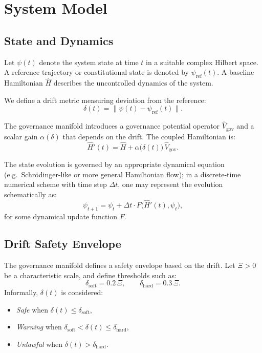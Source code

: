 \documentclass[11pt]{article}
\begin{document}
\section{System Model}

\subsection{State and Dynamics}

Let $\psi(t)$ denote the system state at time $t$ in a suitable complex Hilbert space.
A reference trajectory or constitutional state is denoted by $\psi_{\mathrm{ref}}(t)$.
A baseline Hamiltonian $\hat{H}$ describes the uncontrolled dynamics of the system.

We define a drift metric measuring deviation from the reference:
\begin{equation}
  \delta(t) = \|\psi(t) - \psi_{\mathrm{ref}}(t)\|.
\end{equation}

The governance manifold introduces a governance potential operator $\hat{V}_{\mathrm{gov}}$ and a scalar gain $\alpha(\delta)$ that depends on the drift.
The coupled Hamiltonian is:
\begin{equation}
  \hat{H}'(t) = \hat{H} + \alpha\big(\delta(t)\big)\,\hat{V}_{\mathrm{gov}}.
\end{equation}

The state evolution is governed by an appropriate dynamical equation (e.g.\ Schr\"odinger-like or more general Hamiltonian flow); in a discrete-time numerical scheme with time step $\Delta t$, one may represent the evolution schematically as:
\begin{equation}
  \psi_{t+1} = \psi_t + \Delta t \cdot F\big(\hat{H}'(t), \psi_t\big),
\end{equation}
for some dynamical update function $F$.

\subsection{Drift Safety Envelope}

The governance manifold defines a safety envelope based on the drift.
Let $\Xi > 0$ be a characteristic scale, and define thresholds such as:
\begin{equation}
  \delta_{\mathrm{soft}} = 0.2\,\Xi,
  \qquad
  \delta_{\mathrm{hard}} = 0.3\,\Xi.
\end{equation}
Informally, $\delta(t)$ is considered:
\begin{itemize}[noitemsep]
    \item \emph{Safe} when $\delta(t) \le \delta_{\mathrm{soft}}$,
    \item \emph{Warning} when $\delta_{\mathrm{soft}} < \delta(t) \le \delta_{\mathrm{hard}}$,
    \item \emph{Unlawful} when $\delta(t) > \delta_{\mathrm{hard}}$.
\end{itemize}
\end{document}

